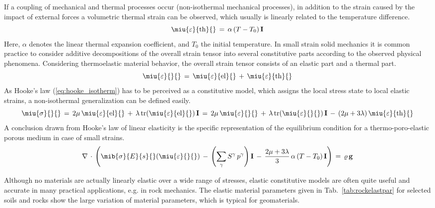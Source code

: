 If a coupling of mechanical and thermal processes occur (non-isothermal mechanical processes), in addition to the strain caused by the
impact of external forces a volumetric thermal strain can be observed, which usually is linearly related to
the temperature difference.
\begin{equation}
\miu{\varepsilon}{\mathrm{th}}{}\,=\,\alpha\,(T-T_0)\,\mathbf{I}
\end{equation}
Here, $\alpha$ denotes the linear thermal expansion coefficient, and $T_0$ the initial temperature. In small strain solid mechanics it is
common practice to consider additive decompositions of the overall strain tensor into several constitutive parts according to the observed
physical phenomena. Considering thermoelastic material behavior, the overall strain tensor consists of an elastic part and a thermal part.
\begin{equation}
\miu{\varepsilon}{}{}\,=\,\miu{\varepsilon}{\mathrm{el}}{}\,+\,\miu{\varepsilon}{\mathrm{th}}{}
\end{equation}
As Hooke's law (\ref{eq:hooke_isotherm}) has to be perceived as a constitutive model, which assigns the local stress state to local elastic
strains, a non-isothermal generalization can be defined easily. 
\begin{equation}
\miu{\sigma}{}{}\,=\,2\mu\,\miu{\varepsilon}{\mathrm{el}}{}\,+\,\lambda\,\mathrm{tr}(\miu{\varepsilon}{\mathrm{el}}{})\,\mathbf{I}
                \,=\,2\mu\,\miu{\varepsilon}{}{}\,+\,\lambda\,\mathrm{tr}(\miu{\varepsilon}{}{})\,\mathbf{I}
                \,-\,(2\mu+3\lambda)\,\miu{\varepsilon}{\mathrm{th}}{}
\label{eq:hooke_nonisotherm}
\end{equation}
A conclusion drawn from Hooke's law of linear elasticity is the specific representation of the equilibrium condition for a thermo-poro-elastic porous medium in case of small strains.
\begin{equation}
\nabla\,\cdot\,
\left(
\mib{\sigma}{E}{s}{}(\miu{\varepsilon}{}{})\,-\,
\left(\sum\limits_{\gamma}S^{\gamma}\,p^{\gamma}\right)\mathbf{I}\,-\,
\frac{2\mu+3\lambda}{3}\,\alpha\,(T-T_0)\,\mathbf{I}
\right)
\,=\,\varrho\,\mathbf{g}
\label{eq:equi_thermo_poro_elast}
\end{equation}

Although no materials are actually linearly elastic over a wide range of stresses, elastic constitutive models are often quite useful and
accurate in many practical applications, e.g. in rock mechanics. The elastic material parameters given in Tab.~\ref{tab:rockelastpar} for 
selected soils and rocks show the large variation of material parameters, which is typical for geomaterials. 

